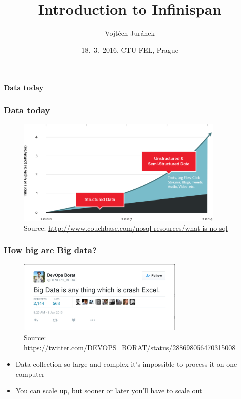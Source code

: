 \documentclass[10pt,utf8]{beamer}
\title{Introduction to Infinispan}
\author{Vojtěch Juránek}
\institute[Red Hat]{JBoss - a division by Red Hat}
\date{18.~3.~2016, CTU FEL, Prague}
\begin{document}


\begin{frame}
 \titlepage
\end{frame}

\begin{frame}
	\centering
	\huge{\textbf{Data today}}
\end{frame}


\begin{frame}
	\frametitle{Data today}
	\begin{figure}
		\centering
		\includegraphics[width=10cm]{./img/why-nosql-2.eps}
		\caption{\tiny{Source: \url{http://www.couchbase.com/nosql-resources/what-is-no-sql}}}
	\end{figure}
\end{frame}

\begin{frame}
	\frametitle{How big are Big data?}
	 {
		\begin{figure}
			\centering
			\includegraphics[width=8cm]{./img/borat_big_data.eps}
			\caption{\tiny{Source: \url{https://twitter.com/DEVOPS\_BORAT/status/288698056470315008}}}
		\end{figure}
	}
	 {
		\begin{itemize}
			\item Data collection so large and complex it's impossible to process it on one computer
			\item You can scale up, but sooner or later you'll have to scale out
		\end{itemize}
	}
\end{frame}
\end{document}
